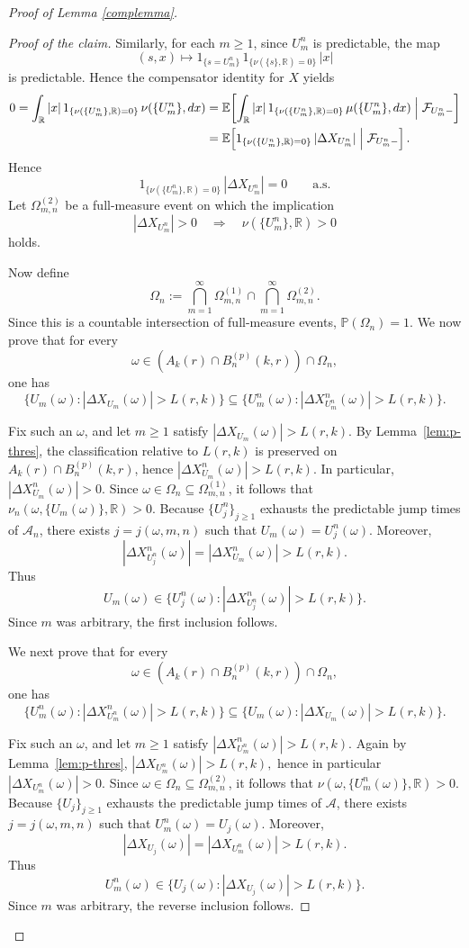 \documentclass[a4paper,10pt]{article}
\newcommand{\E}{\mathbb E}
\begin{document}
\begin{proof}[Proof of Lemma \ref{complemma}]
\begin{proof}[Proof of the claim]
Similarly, for each $m\ge1$, since $U_m^n$ is predictable, the map
\[
(s,x)\mapsto 1_{\{s=U_m^n\}}\,1_{\{\nu(\{s\},\mathbb R)=0\}}\,|x|
\]
is predictable. Hence the compensator identity for $X$ yields
\begin{align*}
0
=
\int_{\mathbb R}
|x|\,1_{\{\nu(\{U_m^n\},\mathbb R)=0\}}\,\nu(\{U_m^n\},dx)
&=
\E\!\left[
\int_{\mathbb R}
|x|\,1_{\{\nu(\{U_m^n\},\mathbb R)=0\}}\,\mu(\{U_m^n\},dx)
\Bigm| \mathcal F_{U_m^n-}
\right]
\\
&=
\E\!\left[
1_{\{\nu(\{U_m^n\},\mathbb R)=0\}}\,|\Delta X_{U_m^n}|
\Bigm| \mathcal F_{U_m^n-}
\right].
\end{align*}
Hence
\[
1_{\{\nu(\{U_m^n\},\mathbb R)=0\}}\,|\Delta X_{U_m^n}|=0
\qquad \text{a.s.}
\]
Let $\Omega^{(2)}_{m,n}$ be a full-measure event on which the implication
\[
|\Delta X_{U_m^n}|>0
\quad\Longrightarrow\quad
\nu(\{U_m^n\},\mathbb R)>0
\]
holds.

Now define
\[
\Omega_{n}
:=
\bigcap_{m=1}^\infty \Omega^{(1)}_{m,n}
\cap
\bigcap_{m=1}^\infty \Omega^{(2)}_{m,n}.
\]
Since this is a countable intersection of full-measure events,
$
\mathbb P(\Omega_{n})=1.
$
We now prove that for every
\[
\omega\in (A_k(r)\cap B_n^{(p)}(k,r))\cap \Omega_{n},
\]
one has
\[
\{U_m(\omega): |\Delta X_{U_m}(\omega)|>L(r,k)\}
\subseteq
\{U_m^n(\omega): |\Delta X^n_{U_m^n}(\omega)|>L(r,k)\}.
\]

Fix such an $\omega$, and let $m\ge1$ satisfy
$
|\Delta X_{U_m}(\omega)|>L(r,k).
$
By Lemma~\ref{lem:p-thres}, the classification relative to $L(r,k)$ is preserved
on $A_k(r)\cap B_n^{(p)}(k,r)$, hence
$
|\Delta X^n_{U_m}(\omega)|>L(r,k).
$
In particular,
$
|\Delta X^n_{U_m}(\omega)|>0.
$
Since $\omega\in\Omega_{n}\subseteq \Omega^{(1)}_{m,n}$, it follows that
$
\nu_n(\omega,\{U_m(\omega)\},\mathbb R)>0.
$
Because $\{U_j^n\}_{j\ge1}$ exhausts the predictable jump times of $\mathcal{A}_n$, there exists
$j=j(\omega,m,n)$ such that
$
U_m(\omega)=U_j^n(\omega).
$
Moreover,
\[
|\Delta X^n_{U_j^n}(\omega)|
=
|\Delta X^n_{U_m}(\omega)|
>
L(r,k).
\]
Thus
\[
U_m(\omega)\in \{U_j^n(\omega): |\Delta X^n_{U_j^n}(\omega)|>L(r,k)\}.
\]
Since $m$ was arbitrary, the first inclusion follows.

We next prove that for every
\[
\omega\in (A_k(r)\cap B_n^{(p)}(k,r))\cap \Omega_{n},
\]
one has
\[
\{U_m^n(\omega): |\Delta X^n_{U_m^n}(\omega)|>L(r,k)\}
\subseteq
\{U_m(\omega): |\Delta X_{U_m}(\omega)|>L(r,k)\}.
\]

Fix such an $\omega$, and let $m\ge1$ satisfy
$
|\Delta X^n_{U_m^n}(\omega)|>L(r,k).
$
Again by Lemma~\ref{lem:p-thres},
$
|\Delta X_{U_m^n}(\omega)|>L(r,k),
$
hence in particular
$
|\Delta X_{U_m^n}(\omega)|>0.
$
Since $\omega\in\Omega_{n}\subseteq \Omega^{(2)}_{m,n}$, it follows that
$
\nu(\omega,\{U_m^n(\omega)\},\mathbb R)>0.
$
Because $\{U_j\}_{j\ge1}$ exhausts the predictable jump times of $\mathcal{A}$, there exists
$j=j(\omega,m,n)$ such that
$
U_m^n(\omega)=U_j(\omega).
$
Moreover,
\[
|\Delta X_{U_j}(\omega)|
=
|\Delta X_{U_m^n}(\omega)|
>
L(r,k).
\]
Thus
\[
U_m^n(\omega)\in \{U_j(\omega): |\Delta X_{U_j}(\omega)|>L(r,k)\}.
\]
Since $m$ was arbitrary, the reverse inclusion follows.


\end{proof}
\end{proof}
\end{document}
